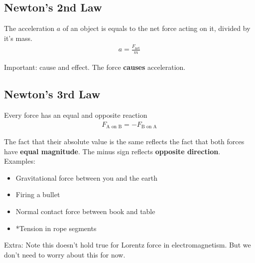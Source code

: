 \documentclass{article}
\begin{document}
\subsection{Newton's 2nd Law}
The acceleration $a$ of an object is equals to the net force acting on it, divided by it's mass.
\begin{align}
    a = \frac{F_\text{net}}{m}
\end{align}

\noindent Important: cause and effect. The force \textbf{causes} acceleration. 

\subsection{Newton's 3rd Law}
Every force has an equal and opposite reaction
\begin{align}
    F_{\text{A on B}} = -F_{\text{B on A}}
\end{align}

\noindent The fact that their absolute value is the same reflects the fact that both forces have \textbf{equal magnitude}. The minus sign reflects \textbf{opposite direction}. \\[10pt]
\noindent Examples: 
\begin{itemize}
    \item Gravitational force between you and the earth
    \item Firing a bullet
    \item Normal contact force between book and table
    \item *Tension in rope segments
\end{itemize}

\noindent Extra: Note this doesn't hold true for Lorentz force in electromagnetism. But we don't need to worry about this for now.
\end{document}
